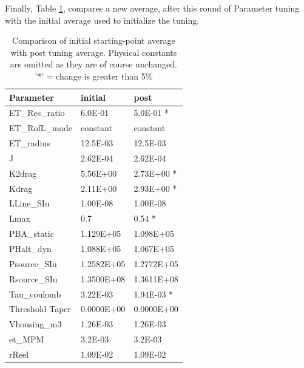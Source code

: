 \documentclass[letterpaper]{article}
\begin{document}
Finally, Table \ref{tab:beforeAfter}, compares a new average, after this round of Parameter
tuning with the initial average used to initialize the tuning.

\begin{table}\centering
\begin{tabular}{l|l|l}\\
Parameter & initial & post \\ \hline
ET\_Res\_ratio     & 6.0E-01 & 5.0E-01 *\\
ET\_RofL\_mode     & constant   & constant   \\
ET\_radius        & 12.5E-03 & 12.5E-03 \\
J                & 2.62E-04 & 2.62E-04 \\
K2drag           & 5.56E+00 & 2.73E+00 *\\
Kdrag            & 2.11E+00 & 2.93E+00 *\\
LLine\_SIu        & 1.00E-08 & 1.00E-08 \\
Lmax             & 0.7 & 0.54 *\\
PBA\_static       & 1.129E+05 & 1.098E+05 \\
PHalt\_dyn        & 1.088E+05 & 1.067E+05 \\
Psource\_SIu      & 1.2582E+05 & 1.2772E+05 \\
Rsource\_SIu      & 1.3500E+08 & 1.3611E+08 \\
Tau\_coulomb      & 3.22E-03 & 1.94E-03 *\\
Threshold Taper  & 0.0000E+00 & 0.0000E+00 \\
Vhousing\_m3      & 1.26E-03 & 1.26E-03 \\
et\_MPM           & 3.2E-03 & 3.2E-03 \\
rReel            & 1.09E-02 & 1.09E-02 \\
\end{tabular}
\caption{Comparison of initial starting-point average with post tuning average.
Physical constants are omitted as they are of course unchanged.
'*' = change is greater than 5\%}\label{tab:beforeAfter}
\end{table}
\end{document}
